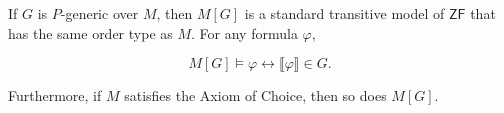 If $G$ is $P$-generic over $M$, then $M[G]$ is a standard transitive model of $\mathsf{ZF}$ that has the same order type as $M$. For any formula $\varphi$,

$$
M[G] \models \varphi \leftrightarrow \llbracket \varphi \rrbracket \in G.
$$

Furthermore, if $M$ satisfies the Axiom of Choice, then so does $M[G]$.

